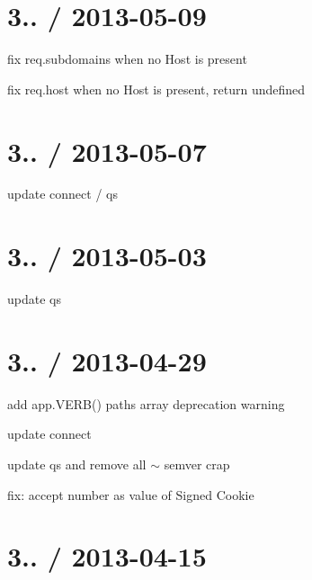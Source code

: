 {\ttfamily \section*{3.. / 2013-\/05-\/09 }}

{\ttfamily }

{\ttfamily 
\begin{DoxyItemize}
\item fix {\ttfamily req.\+subdomains} when no Host is present
\item fix {\ttfamily req.\+host} when no Host is present, return undefined
\end{DoxyItemize}}

{\ttfamily \section*{3.. / 2013-\/05-\/07 }}

{\ttfamily }

{\ttfamily 
\begin{DoxyItemize}
\item update connect / qs
\end{DoxyItemize}}

{\ttfamily \section*{3.. / 2013-\/05-\/03 }}

{\ttfamily }

{\ttfamily 
\begin{DoxyItemize}
\item update qs
\end{DoxyItemize}}

{\ttfamily \section*{3.. / 2013-\/04-\/29 }}

{\ttfamily }

{\ttfamily 
\begin{DoxyItemize}
\item add app.\+V\+E\+R\+B() paths array deprecation warning
\item update connect
\item update qs and remove all $\sim$ semver crap
\item fix\+: accept number as value of Signed Cookie
\end{DoxyItemize}}

{\ttfamily \section*{3.. / 2013-\/04-\/15 }}

